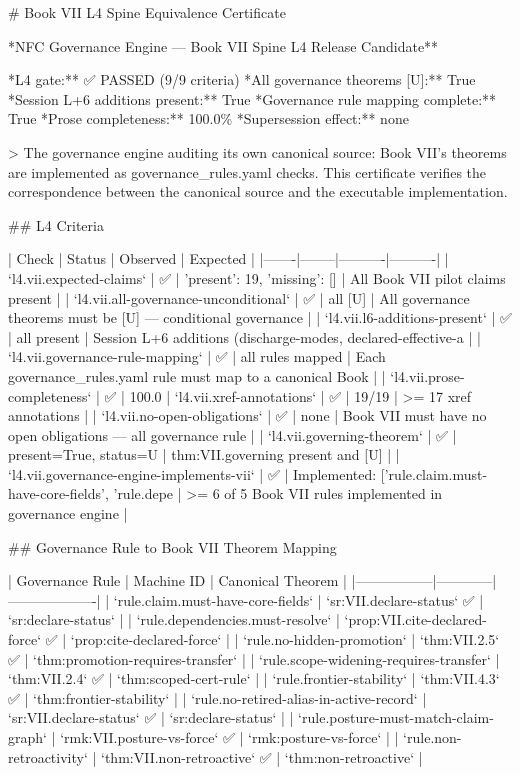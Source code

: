 # Book VII L4 Spine Equivalence Certificate

\noindent **NFC Governance Engine — Book VII Spine L4 Release Candidate**

\noindent **L4 gate:** ✅ PASSED (9/9 criteria)
\noindent **All governance theorems [U]:** True
\noindent **Session L+6 additions present:** True
\noindent **Governance rule mapping complete:** True
\noindent **Prose completeness:** 100.0\%
\noindent **Supersession effect:** none

\noindent > The governance engine auditing its own canonical source: Book VII's theorems are implemented as governance\_rules.yaml checks. This certificate verifies the correspondence between the canonical source and the executable implementation.

## L4 Criteria

| Check | Status | Observed | Expected |
|-------|--------|----------|----------|
| `l4.vii.expected-claims` | ✅ | {'present': 19, 'missing': []} | All Book VII pilot claims present |
| `l4.vii.all-governance-unconditional` | ✅ | all [U] | All governance theorems must be [U] — conditional governance |
| `l4.vii.l6-additions-present` | ✅ | all present | Session L+6 additions (discharge-modes, declared-effective-a |
| `l4.vii.governance-rule-mapping` | ✅ | all rules mapped | Each governance_rules.yaml rule must map to a canonical Book |
| `l4.vii.prose-completeness` | ✅ | 100.0%
| `l4.vii.xref-annotations` | ✅ | 19/19 | >= 17 xref annotations |
| `l4.vii.no-open-obligations` | ✅ | none | Book VII must have no open obligations — all governance rule |
| `l4.vii.governing-theorem` | ✅ | present=True, status=U | thm:VII.governing present and [U] |
| `l4.vii.governance-engine-implements-vii` | ✅ | Implemented: ['rule.claim.must-have-core-fields', 'rule.depe | >= 6 of 5 Book VII rules implemented in governance engine |

## Governance Rule to Book VII Theorem Mapping

| Governance Rule | Machine ID | Canonical Theorem |
|-----------------|------------|-------------------|
| `rule.claim.must-have-core-fields` | `sr:VII.declare-status` ✅ | `sr:declare-status` |
| `rule.dependencies.must-resolve` | `prop:VII.cite-declared-force` ✅ | `prop:cite-declared-force` |
| `rule.no-hidden-promotion` | `thm:VII.2.5` ✅ | `thm:promotion-requires-transfer` |
| `rule.scope-widening-requires-transfer` | `thm:VII.2.4` ✅ | `thm:scoped-cert-rule` |
| `rule.frontier-stability` | `thm:VII.4.3` ✅ | `thm:frontier-stability` |
| `rule.no-retired-alias-in-active-record` | `sr:VII.declare-status` ✅ | `sr:declare-status` |
| `rule.posture-must-match-claim-graph` | `rmk:VII.posture-vs-force` ✅ | `rmk:posture-vs-force` |
| `rule.non-retroactivity` | `thm:VII.non-retroactive` ✅ | `thm:non-retroactive` |

